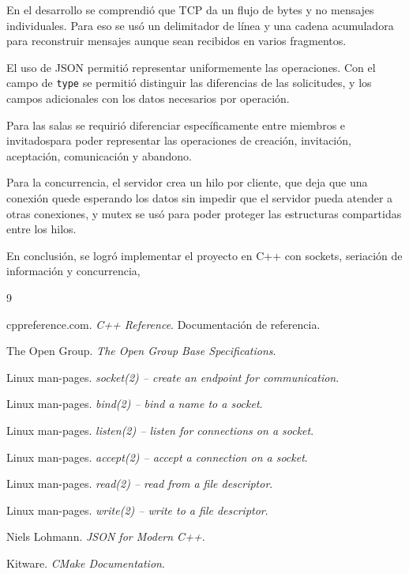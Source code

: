 \documentclass[12pt,letterpaper]{article}
\begin{document}
En el desarrollo se comprendió que TCP
da un flujo de bytes y no mensajes individuales. Para eso se usó un delimitador de línea y una cadena acumuladora para reconstruir mensajes aunque sean recibidos en varios fragmentos.

El uso de JSON permitió representar uniformemente las operaciones. Con el campo de \texttt{type} se permitió distinguir
las diferencias de las solicitudes, y los campos adicionales con los datos necesarios por operación.

Para las salas se requirió diferenciar específicamente entre miembros e invitadospara poder representar las operaciones de creación, invitación, aceptación, comunicación y abandono.

Para la concurrencia, el servidor crea un hilo
por cliente, que deja que una conexión quede esperando los datos sin impedir que el servidor pueda atender a otras conexiones, y mutex se usó para poder proteger las estructuras compartidas entre los hilos.

En conclusión, se logró implementar el proyecto en C++ con sockets, seriación de
información y concurrencia,


\begin{thebibliography}{9}

cppreference.com.
\textit{C++ Reference}.
Documentación de referencia.

The Open Group.
\textit{The Open Group Base Specifications}.

Linux man-pages.
\textit{socket(2) -- create an endpoint for communication}.

Linux man-pages.
\textit{bind(2) -- bind a name to a socket}.


Linux man-pages.
\textit{listen(2) -- listen for connections on a socket}.

Linux man-pages.
\textit{accept(2) -- accept a connection on a socket}.

Linux man-pages.
\textit{read(2) -- read from a file descriptor}.

Linux man-pages.
\textit{write(2) -- write to a file descriptor}.

Niels Lohmann.
\textit{JSON for Modern C++}.

Kitware.
\textit{CMake Documentation}.

\end{thebibliography}
\end{document}
